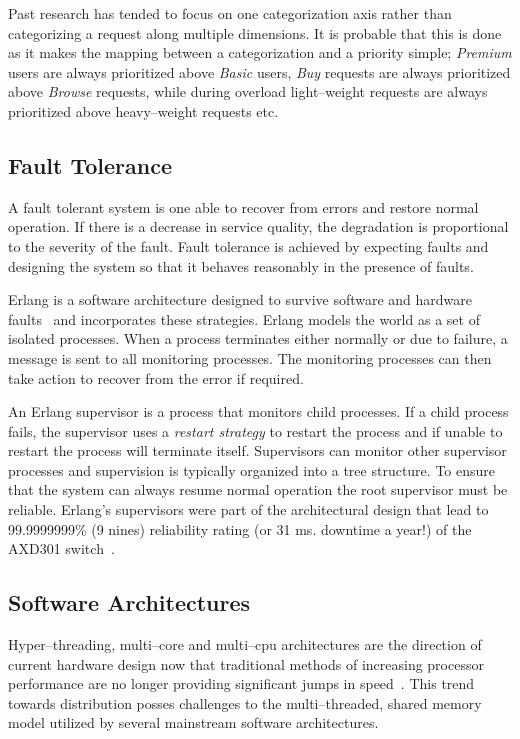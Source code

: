 \documentclass[conference,a4paper,final]{IEEEtran}
\begin{document}
Past research has tended to focus on one categorization axis rather than categorizing a request along multiple dimensions. It is probable that this is done as it makes the mapping between a categorization and a priority simple; \emph{Premium} users are always prioritized above \emph{Basic} users, \emph{Buy} requests are always prioritized above \emph{Browse} requests, while during overload light--weight requests are always prioritized above heavy--weight requests etc. 

\subsection{Fault Tolerance}

A fault tolerant system is one able to recover from errors and restore normal operation. If there is a decrease in service quality, the degradation is proportional to the severity of the fault. Fault tolerance is achieved by expecting faults and designing the system so that it behaves reasonably in the presence of faults.

Erlang is a software architecture designed to survive software and hardware faults~\cite{Armstrong03Thesis} and incorporates these strategies. Erlang models the world as a set of isolated processes. When a process terminates either normally or due to failure, a message is sent to all monitoring processes. The monitoring processes can then take action to recover from the error if required.

An Erlang supervisor is a process that monitors child processes. If a child process fails, the supervisor uses a \emph{restart strategy} to restart the process and if unable to restart the process will terminate itself. Supervisors can monitor other supervisor processes and supervision is typically organized into a tree structure. To ensure that the system can always resume normal operation the root supervisor must be reliable. Erlang's supervisors were part of the architectural design that lead to 99.9999999\% (9 nines) reliability rating (or 31 ms. downtime a year!) of the AXD301 switch~\cite{armstrong:02:COP}.

\subsection{Software Architectures}

Hyper--threading, multi--core and multi--cpu architectures are the direction of current hardware design now that traditional methods of increasing processor performance are no longer providing significant jumps in speed~\cite{Sutter05Concurrency}. This trend towards distribution posses challenges to the multi--threaded, shared memory model utilized by several mainstream software architectures.
\end{document}
